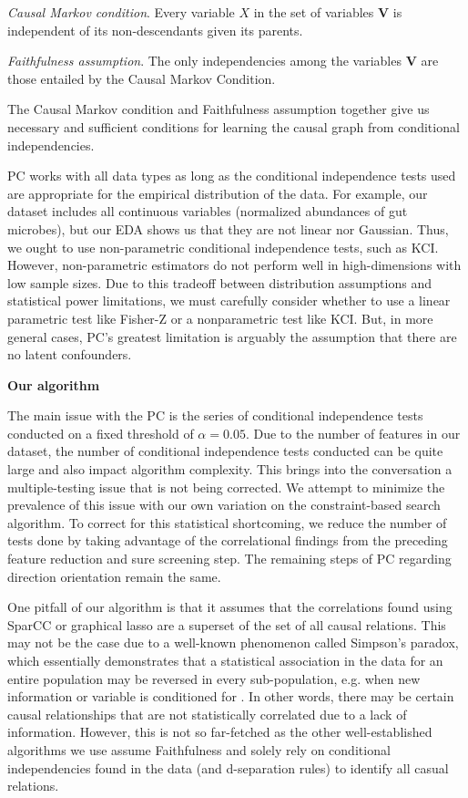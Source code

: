 \documentclass[12pt,letterpaper]{article}
\begin{document}
\textit{Causal Markov condition}. Every variable $X$ in the set of variables $\textbf{V}$ is independent of its non-descendants given its parents. 

\textit{Faithfulness assumption}. The only independencies among the variables $\textbf{V}$ are those entailed by the Causal Markov Condition.

The Causal Markov condition and Faithfulness assumption together give us necessary and sufficient conditions for learning the causal graph from conditional independencies. 

PC works with all data types as long as the conditional independence tests used are appropriate for the empirical distribution of the data. For example, our dataset includes all continuous variables (normalized abundances of gut microbes), but our EDA shows us that they are not linear nor Gaussian. Thus, we ought to use non-parametric conditional independence tests, such as KCI. However, non-parametric estimators do not perform well in high-dimensions with low sample sizes. Due to this tradeoff between distribution assumptions and statistical power limitations, we must carefully consider whether to use a linear parametric test like Fisher-Z or a nonparametric test like KCI. But, in more general cases, PC’s greatest limitation is arguably the assumption that there are no latent confounders. \newline

\textbf{Our algorithm}

The main issue with the PC is the series of conditional independence tests conducted on a fixed threshold of $\alpha = 0.05$. Due to the number of features in our dataset, the number of conditional independence tests conducted can be quite large and also impact algorithm complexity. This brings into the conversation a multiple-testing issue that is not being corrected. We attempt to minimize the prevalence of this issue with our own variation on the constraint-based search algorithm. To correct for this statistical shortcoming, we reduce the number of tests done by taking advantage of the correlational findings from the preceding feature reduction and sure screening step. The remaining steps of PC regarding direction orientation remain the same. 

One pitfall of our algorithm is that it assumes that the correlations found using SparCC or graphical lasso are a superset of the set of all causal relations. This may not be the case due to a well-known phenomenon called Simpson’s paradox, which essentially demonstrates that a statistical association in the data for an entire population may be reversed in every sub-population, e.g. when new information or variable is conditioned for \citep{pearl2016primer}. In other words, there may be certain causal relationships that are not statistically correlated due to a lack of information. However, this is not so far-fetched as the other well-established algorithms we use assume Faithfulness and solely rely on conditional independencies found in the data (and d-separation rules) to identify all casual relations. \newline
\end{document}
